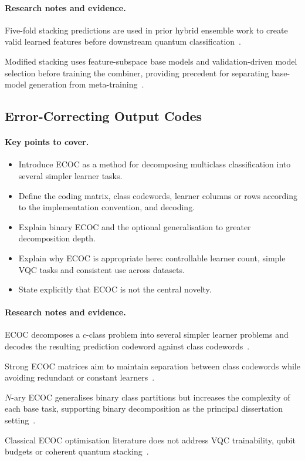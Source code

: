 \documentclass[]{UCD_CS_MSc_AAI_Report}
\newcommand{\motive}[1]{{\color{blue!70!cyan}#1}}
\newcommand{\method}[1]{{\color{cyan!80!black}#1}}
\newcommand{\theory}[1]{{\color{gray}#1}}
\newcommand{\gap}[1]{{\color{black}#1}}
\newcommand{\sectionbrief}{\paragraph{Key points to cover.}}
\newcommand{\researchnotes}{\paragraph{Research notes and evidence.}}
\begin{document}
\researchnotes
\begin{itemize}
    \method{\item Five-fold stacking predictions are used in prior hybrid ensemble work to create valid learned features before downstream quantum classification~\cite{xiong_hybrid_2024}.}
    \method{\item Modified stacking uses feature-subspace base models and validation-driven model selection before training the combiner, providing precedent for separating base-model generation from meta-training~\cite{demir_modified_2018}.}
\end{itemize}

\subsection{Error-Correcting Output Codes}

\sectionbrief
\begin{itemize}
    \item Introduce ECOC as a method for decomposing multiclass classification into several simpler learner tasks.
    \item Define the coding matrix, class codewords, learner columns or rows according to the implementation convention, and decoding.
    \item Explain binary ECOC and the optional generalisation to greater decomposition depth.
    \item Explain why ECOC is appropriate here: controllable learner count, simple VQC tasks and consistent use across datasets.
    \item State explicitly that ECOC is not the central novelty.
\end{itemize}

\researchnotes
\begin{itemize}
    \motive{\item ECOC decomposes a $c$-class problem into several simpler learner problems and decodes the resulting prediction codeword against class codewords~\cite{nguyen_optimal_2021}.}
    \theory{\item Strong ECOC matrices aim to maintain separation between class codewords while avoiding redundant or constant learners~\cite{nguyen_optimal_2021}.}
    \method{\item $N$-ary ECOC generalises binary class partitions but increases the complexity of each base task, supporting binary decomposition as the principal dissertation setting~\cite{nguyen_optimal_2021}.}
    \gap{\item Classical ECOC optimisation literature does not address VQC trainability, qubit budgets or coherent quantum stacking~\cite{nguyen_optimal_2021}.}
\end{itemize}
\end{document}
